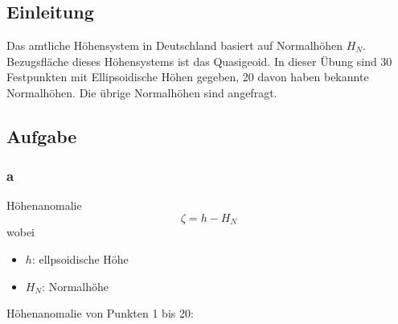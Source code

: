 \newpage
\chapter{}
\section{Einleitung}
Das amtliche Höhensystem in Deutschland basiert auf Normalhöhen $H_N$. Bezugsfläche dieses Höhensystems ist das Quasigeoid. In dieser Übung sind 30 Festpunkten mit Ellipsoidische Höhen gegeben, 20 davon haben bekannte Normalhöhen. Die übrige Normalhöhen sind angefragt. 
\newpage

\section{Aufgabe}
\subsection{a}
Höhenanomalie
\begin{equation*}
	\zeta = h - H_N
\end{equation*}
wobei
\begin{itemize}
	\item $h$: ellpsoidische Höhe
	\item $H_N$: Normalhöhe
\end{itemize}
Höhenanomalie von Punkten 1 bis 20: 

